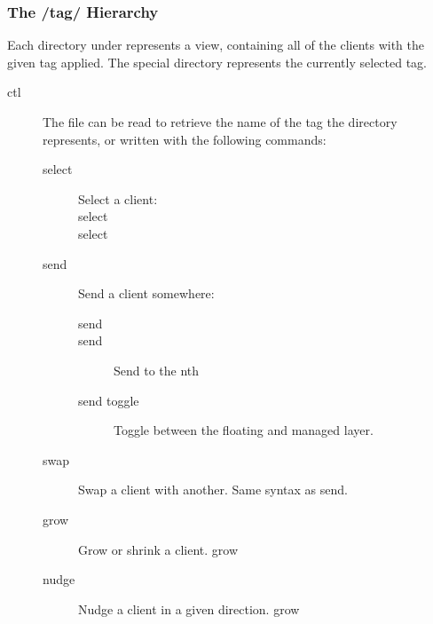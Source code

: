 \subsubsection{The /tag/ Hierarchy}

Each directory under  represents a view, containing
all of the clients with the given tag applied. The special
 directory represents the currently selected tag.

\begin{description}
\item[ctl] The  file can be read to retrieve the name
	of the tag the directory represents, or written with the
	following commands:
	\begin{description}
	\item[select] Select a client: \\
		\SP\SP select  \\
		\SP\SP select  \\
	\item[send] Send a client somewhere:
		\begin{description}
		\item[send  ]
		\item[send  ] Send
			 to the nth 
		\item[send  toggle] Toggle
			 between the floating and
			managed layer.
		\end{description}
	\item[swap] Swap a client with another. Same syntax as
		send.
        \item[grow] Grow or shrink a client.
                \SP\SP grow   \Arg{[amount]}
        \item[nudge] Nudge a client in a given direction.
                \SP\SP grow   \Arg{[amount]}
	\end{description}


\end{description}
